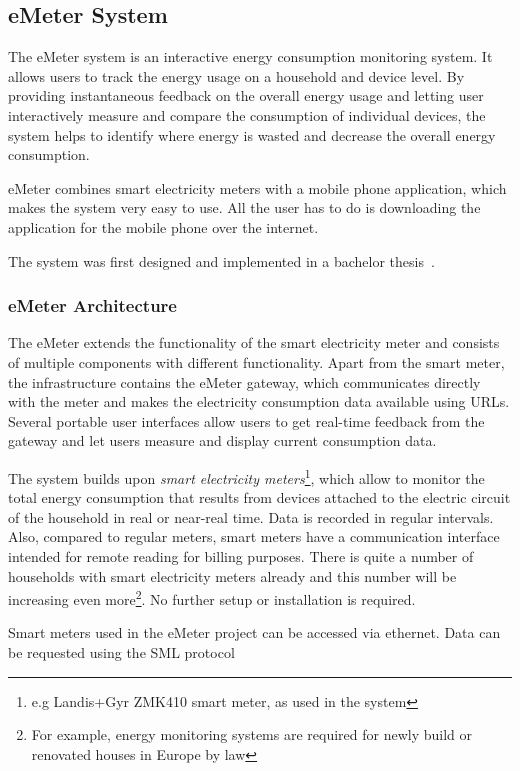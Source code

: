 \subsection{eMeter System}
The eMeter system is an interactive energy consumption monitoring system. It allows users to track the energy usage on a household and device level. By providing instantaneous feedback on the overall energy usage and letting user interactively measure and compare the consumption of individual devices, the system helps to identify where energy is wasted and decrease the overall energy consumption.  

eMeter combines smart electricity meters with a mobile phone application, which makes the system very easy to use.  All the user has to do is downloading the application for the mobile phone over the internet.

The system was first designed and implemented in a bachelor thesis~\cite{roediger}. 

\subsubsection{eMeter Architecture}\label{sec:emeter_architecture}
The eMeter extends the functionality of the smart electricity meter and consists of multiple components with different functionality. Apart from the smart meter, the infrastructure contains the eMeter gateway, which communicates directly with the meter and makes the electricity consumption data available using URLs. Several portable user interfaces allow users to get real-time feedback from the gateway and let users measure and display current consumption data.

The system builds upon \textit{smart electricity meters}\footnote{e.g Landis+Gyr ZMK410 smart meter, as used in the system}, which allow to monitor the total energy consumption that results from devices attached to the electric circuit of the household in real or near-real time. Data is recorded in regular intervals. Also, compared to regular meters, smart meters have a communication interface intended for remote reading for billing purposes. There is quite a number of households with smart electricity meters already and this number will be increasing even more\footnote{For example, energy monitoring systems are required for newly build or renovated houses in Europe by law\cite{eu_meter}}. No further setup or installation is required.

Smart meters used in the eMeter project can be accessed via ethernet. Data can be requested using the SML protocol 

